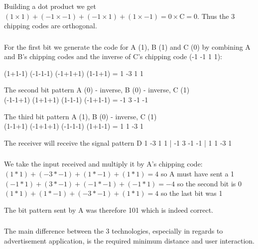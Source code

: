 \documentclass[12pt]{article}
\newcommand{\multipartexercise}{\addtocounter{subsection}{1}\setcounter{subsubsection}{0}}
\newcommand{\exercisepart}{\subsubsection{}}
\begin{document}
\bigskip \noindent
Building a dot product we get $(1 \times 1)+(-1 \times -1)+(-1 \times 1)+(1 \times -1)=0 \times \text{C}=0$. Thus the 3 chipping codes are orthogonal.

\exercisepart
For the first bit we generate the code for A (1), B (1) and C (0) by combining A and B's chipping codes and the inverse of C's chipping code (-1 -1 1 1):

\bigskip
\noindent
(1+1-1) (-1-1-1) (-1+1+1) (1-1+1) = 1 -3 1 1

\bigskip
\noindent
The second bit pattern A (0) - inverse, B (0) - inverse, C (1)\\
(-1-1+1) (1+1+1) (1-1-1) (-1+1-1) = -1 3 -1 -1

\bigskip
\noindent
The third bit pattern A (1), B (0) - inverse, C (1)\\
(1-1+1) (-1+1+1) (-1-1-1) (1+1-1) = 1 1 -3 1

\bigskip
\noindent
The receiver will receive the signal pattern D 1 -3 1 1 | -1 3 -1 -1 | 1 1 -3 1

\exercisepart
We take the input received and multiply it by A's chipping code:\\
$(1*1) + (-3*-1) + (1*-1) + (1*1) = 4$ so A must have sent a 1\\
$(-1*1) + (3*-1) + (-1*-1) + (-1*1) = -4$ so the second bit is 0\\
$(1*1) + (1*-1) + (-3*-1) + (1*1) = 4$ so the last bit was 1

\bigskip
\noindent
The bit pattern sent by A was therefore 101 which is indeed correct.

\multipartexercise
\exercisepart
The main difference between the 3 technologies, especially in regards to advertisement application, is the required minimum distance and user interaction.
\end{document}
